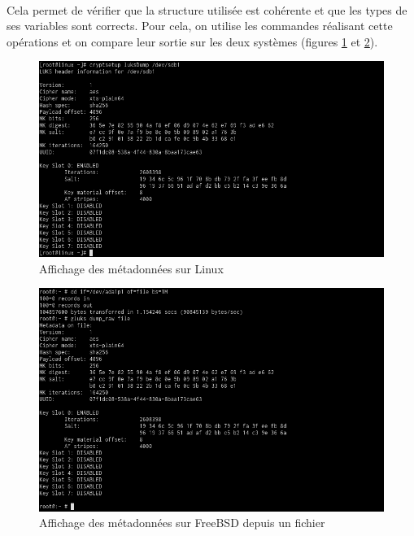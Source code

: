 \paragraph{}
Cela permet de vérifier que la structure utilisée est cohérente et que les types
de ses variables sont corrects. Pour cela, on utilise les commandes réalisant
cette opérations et on compare leur sortie sur les deux systèmes (figures
\ref{fig:linux_dump_file} et \ref{fig:freebsd_dump_file}).
\begin{figure}[H]
  \centering
  \includegraphics[width=\linewidth]{tests/linux_dump_disk.png}
  \caption{\label{fig:linux_dump_file}Affichage des métadonnées sur Linux}
\end{figure}
\begin{figure}[H]
  \centering
  \includegraphics[width=\linewidth]{tests/freebsd_dump_file.png}
  \caption{\label{fig:freebsd_dump_file}Affichage des métadonnées sur FreeBSD
    depuis un fichier}
\end{figure}

